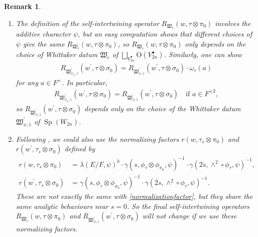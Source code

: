 \documentclass[article]{article}
\numberwithin{equation}{section}
\newtheorem{remark}[theorem]{Remark}
\theoremstyle{definition}
\DeclareMathOperator{\SP}{Sp}
\begin{document}
\begin{remark}
\begin{enumerate}
	\item The definition of the self-intertwining operator $R_{\mathfrak W_{c}}(w, \tau \otimes \pi_0)$ involves the additive character $\psi$, but an easy computation shows that different choices of  $\psi$ give the same $R_{\mathfrak W_{c}}(w, \tau \otimes \pi_0)$, so  $R_{\mathfrak W_{c}}(w, \tau \otimes \pi_0)$ only depends on the choice of Whittaker datum $\mathfrak W_{c}$ of $\bigsqcup_{V_{2n}^{\bullet}} \mathrm O(V_{2n}^\bullet)$. Similarly, one can show 
	\begin{align*}
	R_{\mathfrak W^\prime_{\psi_a,1}}(w^{\prime}, \tau \otimes \sigma_0)=R_{\mathfrak W^\prime_{\psi,1}}(w^{\prime}, \tau \otimes \sigma_0)\cdot \omega_{\tau}(a)
	\end{align*}
	for any $a\in F^\times$. In particular, 
	\begin{align*}
	R_{\mathfrak W^\prime_{\psi_a,1}}(w^{\prime}, \tau \otimes \sigma_0)=R_{\mathfrak W^\prime_{\psi,1}}(w^{\prime}, \tau \otimes \sigma_0) \quad \mbox{if $a\in F^{\times 2}$}, 
	\end{align*}
	so $R_{\mathfrak W^\prime_{\psi,1}}(w^{\prime}, \tau \otimes \sigma_0)$ depends only on the choice of the Whittaker datum $\mathfrak W^\prime_{\psi,1}$ of $\SP(W_{2n})$. 
	\item Following \cite[\S 7.3]{MR3573972}, we could also use the normalizing factors $r\left(w, \tau_{s} \otimes \pi_0\right)$ and $r\left(w^\prime, \tau_{s} \otimes \sigma_0\right)$ defined by
	\begin{equation}
	\begin{aligned}
	r\left(w, \tau_{s} \otimes \pi_0\right)&=\lambda(E / F, \psi)^{k}\cdot \gamma(s,\phi_{\tau}\otimes\phi_{\pi_0},\psi)^{-1}\cdot \gamma(2s,\wedge^{2} \circ \phi_{\tau},\psi)^{-1},\\
	r\left(w^\prime, \tau_{s} \otimes \sigma_0\right)&= \gamma(s,\phi_{\tau}\otimes\phi_{\sigma_0},\psi)^{-1}\cdot \gamma(2s,\wedge^{2} \circ \phi_{\tau},\psi)^{-1}. 
	\end{aligned}
	\end{equation}
	These are not exactly the same with  \ref{normalizationfactor}, but they share the same analytic behaviours near $s=0$. So the final self-intertwining operators $R_{\mathfrak W_{c}}(w, \tau \otimes \pi_0)$ and $R_{\mathfrak W^\prime_{\psi,1}}(w^{\prime}, \tau \otimes \sigma_0)$ will not change if we use these normalizing factors.  
\end{enumerate}
\end{remark}
\end{document}
